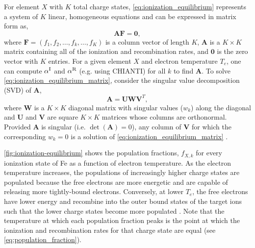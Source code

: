 For element $X$ with $K$ total charge states, \autoref{eq:ionization_equilibrium} represents a system of $K$ linear, homogeneous equations and can be expressed in matrix form as,
\begin{equation}\label{eq:ionization_equilibrium_matrix}
    \mathbf{A}\mathbf{F} = \mathbf{0},
\end{equation}
where $\mathbf{F}=(f_1,f_2,\ldots,f_k,\ldots,f_K)$ is a column vector of length $K$, $\mathbf{A}$ is a $K{\times}K$ matrix containing all of the ionization and recombination rates, and $\mathbf{0}$ is the zero vector with $K$ entries. For a given element $X$ and electron temperature $T_e$, one can compute $\alpha^\textup{I}$ and $\alpha^\textup{R}$ (e.g. using CHIANTI) for all $k$ to find $\mathbf{A}$. To solve \autoref{eq:ionization_equilibrium_matrix}, consider the singular value decomposition (SVD) of $\mathbf{A}$,
\begin{equation}
    \mathbf{A} = \mathbf{U}\mathbf{W}\mathbf{V}^T,
\end{equation}
where $\mathbf{W}$ is a $K{\times}K$ diagonal matrix with singular values ($w_k$) along the diagonal and $\mathbf{U}$ and $\mathbf{V}$ are  square $K{\times}K$ matrices whose columns are orthonormal. Provided $\mathbf{A}$ is singular (i.e. $\det{(\mathbf{A})}=0$), any column of $\mathbf{V}$ for which the corresponding $w_k=0$ is a solution of \autoref{eq:ionization_equilibrium_matrix} \citep{press_numerical_1992}. 

\autoref{fig:ionization-equilibrium} shows the population fractions, $f_{X,k}$ for every ionization state of Fe as a function of electron temperature. As the electron temperature increases, the populations of increasingly higher charge states are populated because the free electrons are more energetic and are capable of releasing more tightly-bound electrons. Conversely, at lower $T_e$, the free electrons have lower energy and recombine into the outer bound states of the target ions such that the lower charge states become more populated \citep{bradshaw_collisional_2013}. Note that the temperature at which each population fraction peaks is the point at which the ionization and recombination rates for that charge state are equal (see \autoref{eq:population_fraction}).

